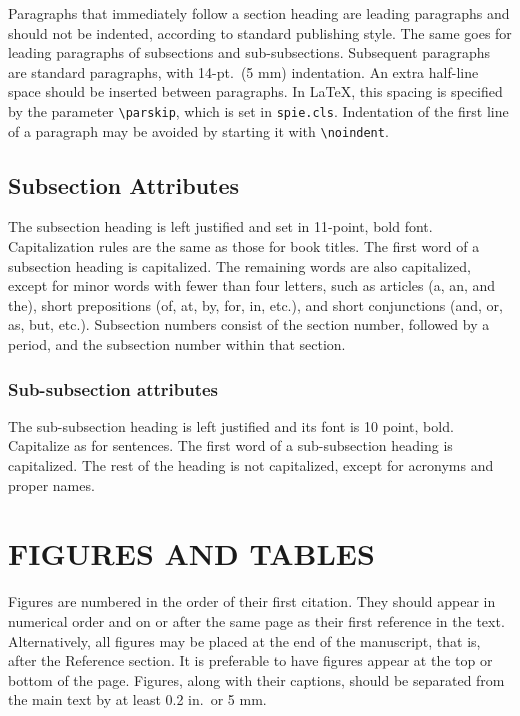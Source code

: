\documentclass[]{spie}  %
\begin{document}
Paragraphs that immediately follow a section heading are leading
paragraphs and should not be indented, according to standard
publishing style\cite{Lamport94}.  The same goes for leading
paragraphs of subsections and sub-subsections.  Subsequent paragraphs
are standard paragraphs, with 14-pt.\ (5 mm) indentation.  An extra
half-line space should be inserted between paragraphs.  In LaTeX, this
spacing is specified by the parameter \verb|\parskip|, which is set in
{\tt spie.cls}.  Indentation of the first line of a paragraph may be
avoided by starting it with \verb|\noindent|.
 
\subsection{Subsection Attributes}

The subsection heading is left justified and set in 11-point, bold
font.  Capitalization rules are the same as those for book titles.
The first word of a subsection heading is capitalized.  The remaining
words are also capitalized, except for minor words with fewer than
four letters, such as articles (a, an, and the), short prepositions
(of, at, by, for, in, etc.), and short conjunctions (and, or, as, but,
etc.).  Subsection numbers consist of the section number, followed by
a period, and the subsection number within that section.

\subsubsection{Sub-subsection attributes}
The sub-subsection heading is left justified and its font is 10 point,
bold.  Capitalize as for sentences.  The first word of a
sub-subsection heading is capitalized.  The rest of the heading is not
capitalized, except for acronyms and proper names.

\section{FIGURES AND TABLES}

Figures are numbered in the order of their first citation.  They
should appear in numerical order and on or after the same page as
their first reference in the text.  Alternatively, all figures may be
placed at the end of the manuscript, that is, after the Reference
section.  It is preferable to have figures appear at the top or bottom
of the page.  Figures, along with their captions, should be separated
from the main text by at least 0.2 in.\ or 5 mm.
\end{document}
